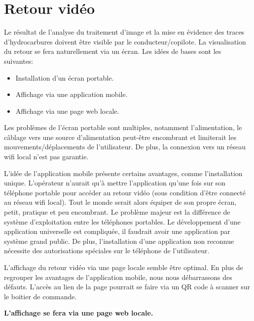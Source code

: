\section{Retour vidéo}
Le résultat de l'analyse du traitement d'image et la mise en évidence des traces d'hydrocarbures doivent être visible par le conducteur/copilote.
La visualisation du retour se fera naturellement via un écran. Les idées de bases sont les suivantes:
\begin{itemize}
    \item Installation d'un écran portable.
    \item Affichage via une application mobile.
    \item Affichage via une page web locale.
\end{itemize}

Les problèmes de l'écran portable sont multiples, notamment l'alimentation, le câblage vers une source d'alimentation peut-être encombrant
et limiterait les mouvements/déplacements de l'utilisateur. De plus, la connexion vers un réseau \Gls{wifi} local n'est pas garantie.

L'idée de l'application mobile présente certains avantages, comme l'installation unique. L'opérateur n'aurait qu'à mettre l'application
qu'une fois sur son téléphone portable pour accéder au retour vidéo (sous condition d'être connecté au réseau \Gls{wifi} local).
Tout le monde serait alors équiper de son propre écran, petit, pratique et peu encombrant. Le problème majeur est la différence de système d'exploitation
entre les téléphones portables. Le développement d'une application universelle est compliquée, il faudrait avoir une application par système grand public.
De plus, l'installation d'une application non reconnue nécessite des autorisations spéciales sur le téléphone de l'utilisateur.

L'affichage du retour vidéo via une page locale semble être optimal. En plus de regrouper les avantages de l'application mobile, nous nous débarrassons des défauts.
L'accès au lien de la page pourrait se faire via un QR code à scanner sur le boitier de commande.

\textbf{L'affichage se fera via une page web locale.}

